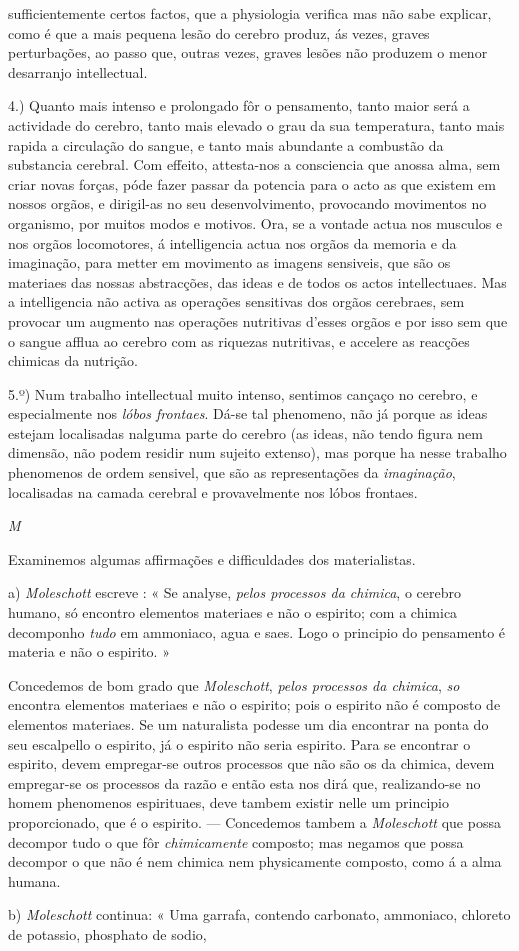 sufficientemente certos factos, que a physiologia verifica mas não sabe explicar, como é que a mais pequena lesão do cerebro produz, ás vezes, graves perturbações, ao passo que, outras vezes, graves lesões não produzem o menor desarranjo intellectual.\par 4.) Quanto mais intenso e prolongado fôr o pensamento, tanto maior será a actividade do cerebro, tanto mais elevado o grau da sua temperatura, tanto mais rapida a circulação do sangue, e tanto mais abundante a combustão da substancia cerebral. Com effeito, attesta-nos a consciencia que anossa alma, sem criar novas forças, póde fazer passar da potencia para o acto as que existem em nossos orgãos, e dirigil-as no seu desenvolvimento, provocando movimentos no organismo, por muitos modos e motivos. Ora, se a vontade actua nos musculos e nos orgãos locomotores, á intelligencia actua nos orgãos da memoria e da imaginação, para metter em movimento as imagens sensiveis, que são os materiaes das nossas abstracções, das ideas e de todos os actos intellectuaes. Mas a intelligencia não activa as operações sensitivas dos orgãos cerebraes, sem provocar um augmento nas operações nutritivas d'esses orgãos e por isso sem que o sangue afflua ao cerebro com as riquezas nutritivas, e accelere as reacções chimicas da nutrição.\par 5.º) Num trabalho intellectual muito intenso, sentimos cançaço no cerebro, e especialmente nos \emph{lóbos frontaes}. Dá-se tal phenomeno, não já porque as ideas estejam localisadas nalguma parte do cerebro (as ideas, não tendo figura nem dimensão, não podem residir num sujeito extenso), mas porque ha nesse trabalho phenomenos de ordem sensivel, que são as representações da \emph{imaginação}, localisadas na camada cerebral e provavelmente nos lóbos frontaes.\par \emph{M}\par Examinemos algumas affirmações e difficuldades dos materialistas.\par a) \emph{Moleschott} escreve : « Se analyse, \emph{pelos processos da chimica}, o cerebro humano, só encontro elementos materiaes e não o espirito; com a chimica decomponho \emph{tudo} em ammoniaco, agua e saes. Logo o principio do pensamento é materia e não o espirito. »\par Concedemos de bom grado que \emph{Moleschott}, \emph{pelos processos da chimica}, \emph{so} encontra elementos materiaes e não o espirito; pois o espirito não é composto de elementos materiaes. Se um naturalista podesse um dia encontrar na ponta do seu escalpello o espirito, já o espirito não seria espirito. Para se encontrar o espirito, devem empregar-se outros processos que não são os da chimica, devem empregar-se os processos da razão e então esta nos dirá que, realizando-se no homem phenomenos espirituaes, deve tambem existir nelle um principio proporcionado, que é o espirito. --- Concedemos tambem a \emph{Moleschott} que possa decompor tudo o que fôr \emph{chimicamente} composto; mas negamos que possa decompor o que não é nem chimica nem physicamente composto, como á a alma humana.\par b) \emph{Moleschott} continua: « Uma garrafa, contendo carbonato, ammoniaco, chloreto de potassio, phosphato de sodio, 